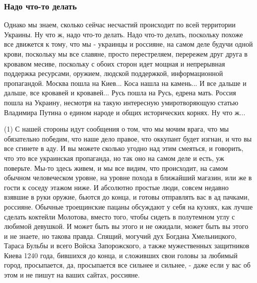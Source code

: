  
 
 
 
 

\subsubsection{Надо что-то делать}

Однако мы знаем, сколько сейчас несчастий происходит по всей территории
Украины. Ну что ж, надо что-то делать. Надо что-то делать, поскольку похоже все
движется к тому, что мы - украинцы и россияне, на самом деле будучи одной
крови, поскольку мы все славяне, просто перестреляем, перережем друг друга в
кровавом месиве, поскольку с обоих сторон идет мощная и непрерывная поддержка
ресурсами, оружием, людской поддержкой, информационной пропагандой. Москва
пошла на Киев... Коса нашла на камень... И все дальше и дальше, все кровавей и
кровавей... Русь пошла на Русь, едрена мать. Россия пошла на Украину, несмотря
на такую интересную умиротворяющую статью Владимира Путина о едином народе и
общих исторических корнях. Ну что ж... 

(1) С нашей стороны идут сообщения о том, что мы мочим врага, что мы
обязательно победим, что наше дело правое, что оккупант будет изгнан, и что вы
все сгинете в аду. И вы можете сколько угодно над этим смеяться, и говорить,
что это все украинская пропаганда, но так оно на самом деле и есть, уж
поверьте.  Мы-то здесь живем, и мы все видим, что происходит, на самом обычном
человеческом уровне, на уровне похода в ближайший магазин, или же в гости к
соседу этажом ниже. И абсолютно простые люди, совсем недавно взявшие в руки
оружие, бьются до конца, и готовы отправлять вас в ад пачками, россияне.
Обычные троещинские пацаны обсуждают у себя на кухнях, как лучше сделать
коктейли Молотова, вместо того, чтобы сидеть в полутемном углу с любимой
девушкой. И может быть вы этого и не ожидали, может быть вы этого и не знаете,
но такова правда.  Спящий, могучий дух Богдана Хмельницкого, Тараса Бульбы и
всего Войска Запорожского, а также мужественных защитников Киева 1240 года,
бившихся до конца, и сложивших свои головы за любимый город, просыпается, да,
просыпается все сильнее и сильнее, - даже если у вас об этом и не пишут на
ваших сайтах, россияне.

